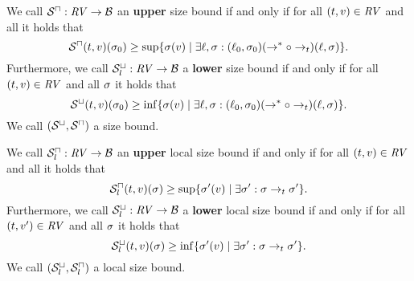 \begin{definition}
  We call ${\mathcal{S}^\sqcap}: \mathit{RV} \rightarrow \mathcal{B}$ an \textbf{upper} size bound if and only if for all $(t, v) \in \mathit{RV}$ and all  it holds that
  \[ {\mathcal{S}^\sqcap}(t, v)(\sigma_0) \geq \sup \lbrace \sigma(v) \mid \exists \ell, \sigma: (\ell_0, \sigma_0) (\rightarrow^* \circ \rightarrow_t) (\ell, \sigma) \rbrace. \]
  Furthermore, we call ${\mathcal{S}^\sqcup_l}: \mathit{RV} \rightarrow \mathcal{B}$ a \textbf{lower} size bound if and only if for all $(t, v) \in \mathit{RV}$ and all $\sigma$ it holds that
  \[ {\mathcal{S}^\sqcup}(t, v)(\sigma_0) \geq \inf \lbrace \sigma(v) \mid \exists \ell, \sigma: (\ell_0, \sigma_0) (\rightarrow^* \circ \rightarrow_t) (\ell, \sigma) \rbrace. \]
  We call ${({\mathcal{S}^\sqcup}, {\mathcal{S}^\sqcap})}$ a size bound.
\end{definition}

\begin{definition}
  We call ${\mathcal{S}^\sqcap_l}: \mathit{RV} \rightarrow \mathcal{B}$ an \textbf{upper} local size bound if and only if for all $(t, v) \in \mathit{RV}$ and all  it holds that
  \[ {\mathcal{S}^\sqcap_l}(t, v)(\sigma) \geq \sup \lbrace \sigma'(v) \mid \exists \sigma': \sigma \rightarrow_t \sigma' \rbrace. \]
  Furthermore, we call ${\mathcal{S}^\sqcup_l}: \mathit{RV} \rightarrow \mathcal{B}$ a \textbf{lower} local size bound if and only if for all $(t, v') \in \mathit{RV}$ and all $\sigma$ it holds that
  \[ {\mathcal{S}^\sqcup_l}(t, v)(\sigma) \geq \inf \lbrace \sigma'(v) \mid \exists \sigma': \sigma \rightarrow_t \sigma' \rbrace. \]
  We call ${({\mathcal{S}^\sqcup_l}, {\mathcal{S}^\sqcap_l})}$ a local size bound.
\end{definition}
